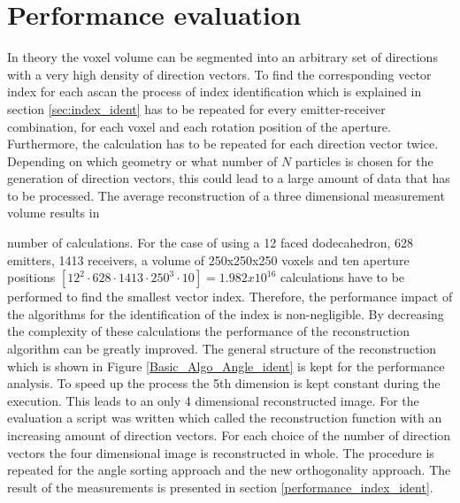 \section{Performance evaluation}
\label{Perform_eval}

In theory the voxel volume can be segmented into an arbitrary set of directions with a very high density of direction vectors. To find the corresponding vector index for each \ac{ascan} the process of index identification which is explained in section \ref{sec:index_ident} has to be repeated for every emitter-receiver combination, for each voxel and each rotation position of the aperture. Furthermore, the calculation has to be repeated for each direction vector twice. Depending on which geometry or what number of $N$ particles is chosen for the generation of direction vectors, this could lead to a large amount of data that has to be processed. The average reconstruction of a three dimensional measurement volume results in

\smallskip
{}
\smallskip
number of calculations. For the case of using a 12 faced dodecahedron, 628 emitters, 1413 receivers, a volume of 250x250x250 voxels and ten aperture positions $[12^2 \cdot 628 \cdot 1413 \cdot 250^3 \cdot 10] = 1.982x10^{16}$ calculations have to be performed to find the smallest vector index. Therefore, the performance impact of the algorithms for the identification of the index is non-negligible. By decreasing the complexity of these calculations the performance of the reconstruction algorithm can be greatly improved. The general structure of the reconstruction which is shown in Figure \ref{Basic_Algo_Angle_ident} is kept for the performance analysis. To speed up the process the 5th dimension is kept constant during the execution. This leads to an only 4 dimensional reconstructed image. For the evaluation a script was written which called the reconstruction function with an increasing amount of direction vectors. For each choice of the number of direction vectors the four dimensional image is reconstructed in whole. The procedure is repeated for the angle sorting approach and the new orthogonality approach. The result of the measurements is presented in section \ref{performance_index_ident}.